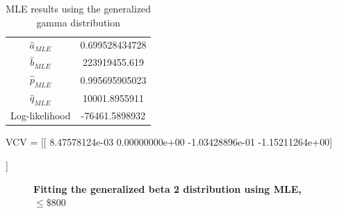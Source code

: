 \documentclass[letterpaper,12pt]{article}
\theoremstyle{definition}
\begin{document}
\begin{table}[h!]
 \centering
 \caption{MLE results using the generalized gamma distribution}
 \begin{tabular}{|c | c |} 
  \hline
  $\hat{a}_{MLE}$ & 0.699528434728 \\ 
  $\hat{b}_{MLE}$ & 223919455.619 \\
  $\hat{p}_{MLE}$ & 0.995695905023 \\
  $\hat{q}_{MLE}$ & 10001.8955911\\
  Log-likelihood & -76461.5898932\\
  \hline
  \end{tabular}
\end{table}
\par
VCV =  [[  8.47578124e-03   0.00000000e+00  -1.03428896e-01  -1.15211264e+00]\par
 [  0.00000000e+00   1.00000000e+00   0.00000000e+00   0.00000000e+00]\par
 [ -1.03428896e-01   0.00000000e+00   1.26223521e+00   1.40607231e+01]\par
 [ -1.15211264e+00   0.00000000e+00   1.40607231e+01   1.56664117e+02]]
 \par

\begin{figure}[H]\centering\captionsetup{width=4.0in}
  \caption{\textbf{Fitting the generalized beta 2 distribution using MLE, $\leq \$800$}}
\end{figure}
\par\bigskip
\end{document}
